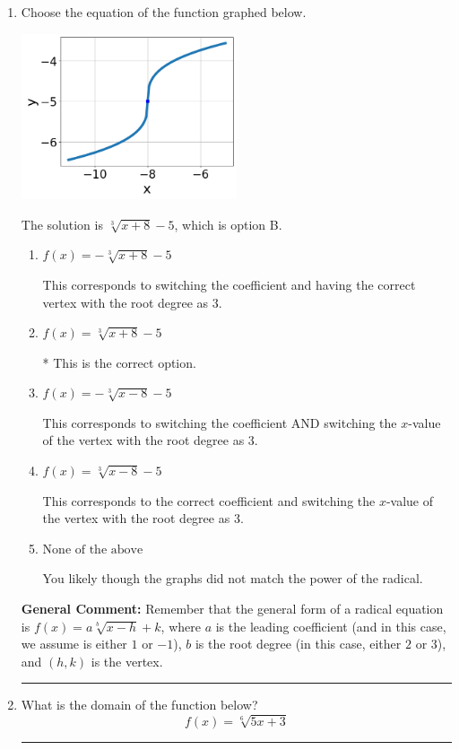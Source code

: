 \documentclass{extbook}[14pt]
\newcommand{\litem}[1]{\item #1

\rule{\textwidth}{0.4pt}}
\begin{document}
\begin{enumerate}\litem{
Choose the equation of the function graphed below.

\begin{center}
    \includegraphics[width=0.5\textwidth]{../Figures/radicalGraphToEquationCopyA.png}
\end{center}




The solution is \( \sqrt[3]{x + 8} - 5 \), which is option B.\begin{enumerate}[label=\Alph*.]
\item \( f(x) = - \sqrt[3]{x + 8} - 5 \)

This corresponds to switching the coefficient and having the correct vertex with the root degree as $3$.
\item \( f(x) = \sqrt[3]{x + 8} - 5 \)

* This is the correct option.
\item \( f(x) = - \sqrt[3]{x - 8} - 5 \)

This corresponds to switching the coefficient AND switching the $x$-value of the vertex with the root degree as $3$.
\item \( f(x) = \sqrt[3]{x - 8} - 5 \)

This corresponds to the correct coefficient and switching the $x$-value of the vertex with the root degree as $3$.
\item \( \text{None of the above} \)

You likely though the graphs did not match the power of the radical.
\end{enumerate}

\textbf{General Comment:} Remember that the general form of a radical equation is $ f(x) = a \sqrt[b]{x - h} + k$, where $a$ is the leading coefficient (and in this case, we assume is either $1$ or $-1$), $b$ is the root degree (in this case, either $2$ or $3$), and $(h, k)$ is the vertex.
}
\litem{
What is the domain of the function below?
\[ f(x) = \sqrt[6]{5 x + 3} \]

}
\end{enumerate}
\end{document}
